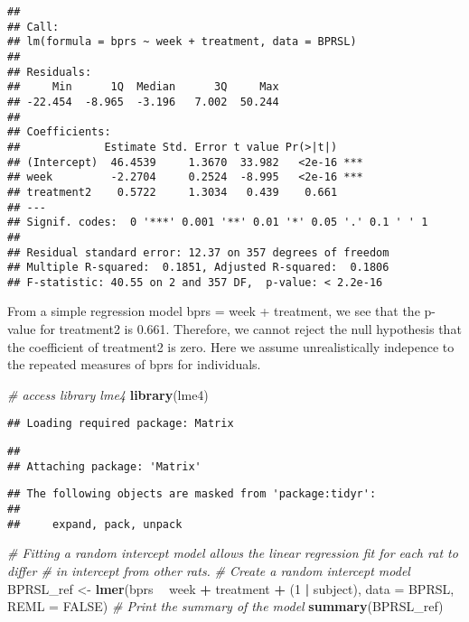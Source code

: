 \documentclass[]{article}
\newenvironment{Shaded}{\begin{snugshade}}{\end{snugshade}}
\newcommand{\CommentTok}[1]{\textcolor[rgb]{0.56,0.35,0.01}{\textit{#1}}}
\newcommand{\DataTypeTok}[1]{\textcolor[rgb]{0.13,0.29,0.53}{#1}}
\newcommand{\DecValTok}[1]{\textcolor[rgb]{0.00,0.00,0.81}{#1}}
\newcommand{\KeywordTok}[1]{\textcolor[rgb]{0.13,0.29,0.53}{\textbf{#1}}}
\newcommand{\NormalTok}[1]{#1}
\newcommand{\OperatorTok}[1]{\textcolor[rgb]{0.81,0.36,0.00}{\textbf{#1}}}
\newcommand{\OtherTok}[1]{\textcolor[rgb]{0.56,0.35,0.01}{#1}}
\newcommand{\StringTok}[1]{\textcolor[rgb]{0.31,0.60,0.02}{#1}}
\begin{document}
\begin{verbatim}
## 
## Call:
## lm(formula = bprs ~ week + treatment, data = BPRSL)
## 
## Residuals:
##     Min      1Q  Median      3Q     Max 
## -22.454  -8.965  -3.196   7.002  50.244 
## 
## Coefficients:
##             Estimate Std. Error t value Pr(>|t|)    
## (Intercept)  46.4539     1.3670  33.982   <2e-16 ***
## week         -2.2704     0.2524  -8.995   <2e-16 ***
## treatment2    0.5722     1.3034   0.439    0.661    
## ---
## Signif. codes:  0 '***' 0.001 '**' 0.01 '*' 0.05 '.' 0.1 ' ' 1
## 
## Residual standard error: 12.37 on 357 degrees of freedom
## Multiple R-squared:  0.1851, Adjusted R-squared:  0.1806 
## F-statistic: 40.55 on 2 and 357 DF,  p-value: < 2.2e-16
\end{verbatim}

From a simple regression model bprs = week + treatment, we see that the
p-value for treatment2 is 0.661. Therefore, we cannot reject the null
hypothesis that the coefficient of treatment2 is zero. Here we assume
unrealistically indepence to the repeated measures of bprs for
individuals.

\begin{Shaded}
\begin{Highlighting}[]
\CommentTok{# access library lme4}
\KeywordTok{library}\NormalTok{(lme4)}
\end{Highlighting}
\end{Shaded}

\begin{verbatim}
## Loading required package: Matrix
\end{verbatim}

\begin{verbatim}
## 
## Attaching package: 'Matrix'
\end{verbatim}

\begin{verbatim}
## The following objects are masked from 'package:tidyr':
## 
##     expand, pack, unpack
\end{verbatim}

\begin{Shaded}
\begin{Highlighting}[]
\CommentTok{# Fitting a random intercept model allows the linear regression fit for each rat to differ # in intercept from other rats.}
\CommentTok{# Create a random intercept model}
\NormalTok{BPRSL_ref <-}\StringTok{ }\KeywordTok{lmer}\NormalTok{(bprs }\OperatorTok{~}\StringTok{ }\NormalTok{week }\OperatorTok{+}\StringTok{ }\NormalTok{treatment }\OperatorTok{+}\StringTok{ }\NormalTok{(}\DecValTok{1} \OperatorTok{|}\StringTok{ }\NormalTok{subject), }\DataTypeTok{data =}\NormalTok{ BPRSL, }\DataTypeTok{REML =} \OtherTok{FALSE}\NormalTok{)}
\CommentTok{# Print the summary of the model}
\KeywordTok{summary}\NormalTok{(BPRSL_ref)}
\end{Highlighting}
\end{Shaded}
\end{document}
